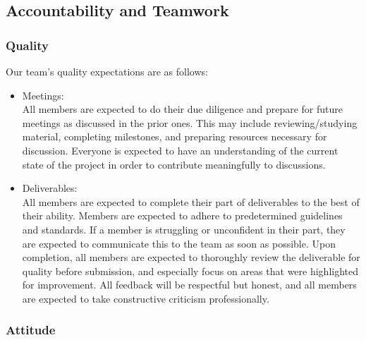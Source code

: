 \documentclass{article}
\begin{document}
\subsection*{Accountability and Teamwork}

\subsubsection*{Quality}

Our team's quality expectations are as follows:
\begin{itemize}
  \item Meetings: \\All members are expected to do their due diligence and prepare for future meetings as discussed in the prior ones. This may include reviewing/studying material, completing milestones, and preparing resources necessary for discussion. Everyone is expected to have an understanding of the current state of the project in order to contribute meaningfully to discussions.
  \item Deliverables: \\All members are expected to complete their part of deliverables to the best of their ability. Members are expected to adhere to predetermined guidelines and standards. If a member is struggling or unconfident in their part, they are expected to communicate this to the team as soon as possible. Upon completion, all members are expected to thoroughly review the deliverable for quality before submission, and especially focus on areas that were highlighted for improvement. All feedback will be respectful but honest, and all members are expected to take constructive criticism professionally.
\end{itemize}

\subsubsection*{Attitude}
\end{document}
